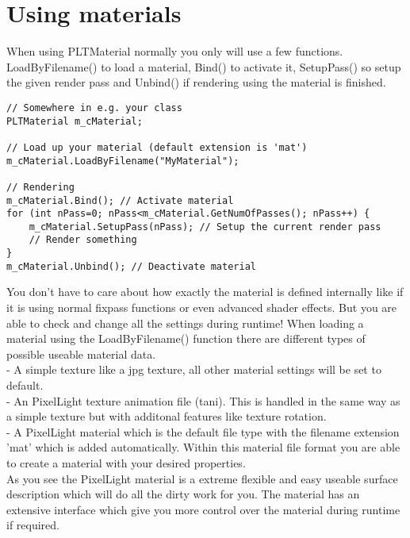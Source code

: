 \section{Using materials}
When using PLTMaterial normally you only will use a few functions. LoadByFilename() to load a material,
Bind() to activate it, SetupPass() so setup the given render pass and Unbind() if rendering using the
material is finished.\\

\begin{lstlisting}[caption=Using materials]
// Somewhere in e.g. your class
PLTMaterial m_cMaterial;

// Load up your material (default extension is 'mat')
m_cMaterial.LoadByFilename("MyMaterial");

// Rendering
m_cMaterial.Bind(); // Activate material
for (int nPass=0; nPass<m_cMaterial.GetNumOfPasses(); nPass++) {
	m_cMaterial.SetupPass(nPass); // Setup the current render pass
	// Render something
}
m_cMaterial.Unbind(); // Deactivate material
\end{lstlisting}

You don't have to care about how exactly the material is defined internally like if it is using
normal fixpass functions or even advanced shader effects. But you are able to check and change all
the settings during runtime!
When loading a material using the LoadByFilename() function there are different types of possible useable
material data.\\
- A simple texture like a jpg texture, all other material settings will be set to default.\\
- An PixelLight texture animation file (tani). This is handled in the same way as a simple texture
  but with additonal features like texture rotation.\\
- A PixelLight material which is the default file type with the filename extension 'mat' which is
  added automatically. Within this material file format you are able to create a material with your
  desired properties.\\

As you see the PixelLight material is a extreme flexible and easy useable surface description which will do
all the dirty work for you. The material has an extensive interface which give you more control
over the material during runtime if required.




